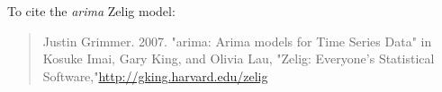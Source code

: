 To cite the \emph{ arima } Zelig model:
 \begin{verse}
 Justin Grimmer. 2007. "arima: Arima models for Time Series Data" in Kosuke Imai, Gary King, and Olivia Lau, "Zelig: Everyone's Statistical Software,"\url{http://gking.harvard.edu/zelig} 
\end{verse}